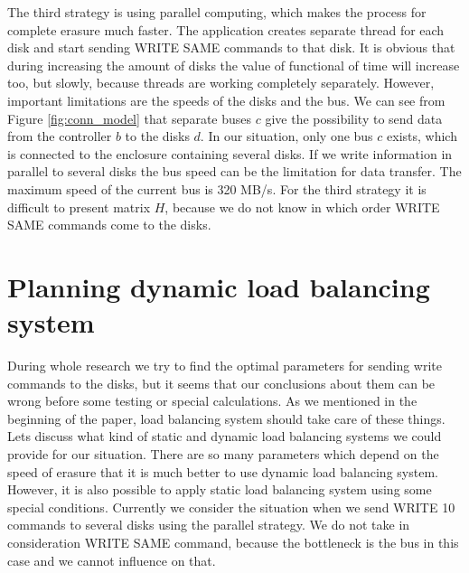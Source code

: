 The third strategy is using parallel computing, which makes the process for complete erasure much faster. The application creates separate thread for each disk and start sending WRITE SAME commands to that disk. It is obvious that during increasing the amount of disks the value of functional of time will increase too, but slowly, because threads are working completely separately. However, important limitations are the speeds of the disks and the bus. We can see from Figure \ref{fig:conn_model} that separate buses $c$ give the possibility to send data from the controller $b$ to the disks $d$. In our situation, only one bus $c$ exists, which is connected to the enclosure containing several disks. If we write information in parallel to several disks the bus speed can be the limitation for data transfer. The maximum speed of the current bus is 320 MB/s. For the third strategy it is difficult to present matrix $H$, because we do not know in which order WRITE SAME commands come to the disks.


\section{Planning dynamic load balancing system}
\label{subsec:plan_load_bal}

During whole research we try to find the optimal parameters for sending write commands to the disks, but it seems that our conclusions about them can be wrong before some testing or special calculations. As we mentioned in the beginning of the paper, load balancing system should take care of these things. Lets discuss what kind of static and dynamic load balancing systems we could provide for our situation. There are so many parameters which depend on the speed of erasure that it is much better to use dynamic load balancing system. However, it is also possible to apply static load balancing system using some special conditions. Currently we consider the situation when we send WRITE 10 commands to several disks using the parallel strategy. We do not take in consideration WRITE SAME command, because the bottleneck is the bus in this case and we cannot influence on that.

